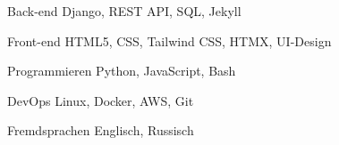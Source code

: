 
\begin{cvskills}

  \cvskill
  {Back-end} %
  {Django, REST API, SQL, Jekyll} %

  \cvskill
  {Front-end} %
  {HTML5, CSS, Tailwind CSS, HTMX, UI-Design} %

  \cvskill
  {Programmieren} %
  {Python, JavaScript, Bash} %

  \cvskill
  {DevOps} %
  {Linux, Docker, AWS, Git} %

  \cvskill
  {Fremdsprachen} %
  {Englisch, Russisch} %

\end{cvskills}
